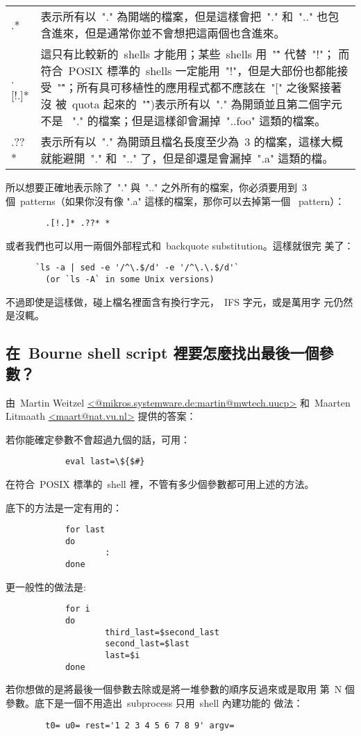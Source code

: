 \documentclass{article}
\begin{document}
\begin{CJK*}{Bg5}{ming}
\begin{tabular}{l  p{10cm}}
	.* &	表示所有以~"." 為開端的檔案，但是這樣會把~"." 和~".." 也包 
		含進來，但是通常你並不會想把這兩個也含進來。 \\

	.[!.]*  & 這只有比較新的~shells 才能用；某些~shells 用~"\^" 代替~"!"；
                而符合~POSIX 標準的~shells 一定能用~"!"，但是大部份也都能接
                受~"\^"；所有具可移植性的應用程式都不應該在~"[" 之後緊接著沒
		被~quota 起來的~"\^")表示所有以~"." 為開頭並且第二個字元不是 
		~"."  的檔案；但是這樣卻會漏掉~"..foo" 這類的檔案。 \\

	.??* &	表示所有以~"." 為開頭且檔名長度至少為~3 的檔案，這樣大概
		就能避開~"." 和~".." 了，但是卻還是會漏掉~".a" 這類的檔。 \\
\end{tabular}

	所以想要正確地表示除了~"." 與~".." 之外所有的檔案，你必須要用到~3 
	個~patterns（如果你沒有像 ".a" 這樣的檔案，那你可以去掉第一個 
	~pattern）：
\begin{verbatim}
        .[!.]* .??* *
\end{verbatim}
	或者我們也可以用一兩個外部程式和~backquote substitution。這樣就很完
	美了：
\begin{verbatim}
      `ls -a | sed -e '/^\.$/d' -e '/^\.\.$/d'`
        (or `ls -A` in some Unix versions)
\end{verbatim}
	不過即使是這樣做，碰上檔名裡面含有換行字元，~IFS 字元，或是萬用字
	元仍然是沒輒。

\subsection{在~Bourne shell script 裡要怎麼找出最後一個參數？}

	由~Martin Weitzel \url{<@mikros.systemware.de:martin@mwtech.uucp>} 
	和~Maarten Litmaath \url{<maart@nat.vu.nl>} 提供的答案：

	若你能確定參數不會超過九個的話，可用：
\begin{verbatim}
	        eval last=\${$#}
\end{verbatim}

	在符合~POSIX 標準的~shell 裡，不管有多少個參數都可用上述的方法。

	底下的方法是一定有用的：
\begin{verbatim}
	        for last
        	do
	                :
	        done
\end{verbatim}

	更一般性的做法是:
\begin{verbatim}
	        for i
	        do
	                third_last=$second_last
	                second_last=$last
	                last=$i
	        done
\end{verbatim}
	若你想做的是將最後一個參數去除或是將一堆參數的順序反過來或是取用
	第~N 個參數。底下是一個不用造出~subprocess 只用~shell 內建功能的
	做法：
\small
\begin{verbatim}
        t0= u0= rest='1 2 3 4 5 6 7 8 9' argv=


\end{verbatim}
\end{CJK*}
\end{document}
